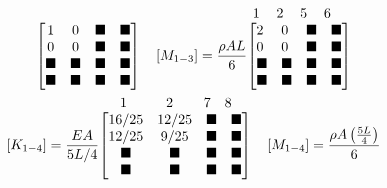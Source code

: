 \documentclass{AeroStructure-ERJohnson}
\begin{document}
\begin{example}
\begin{gather}
\begin{array}[b]{@{}l@{}}
\begin{array}{@{}l}
\end{array}\\
\left[\begin{array}{@{}cccc@{}}
1 & 0 & \blacksquare & \blacksquare \\0 & 0 & \blacksquare & \blacksquare \\\blacksquare & \blacksquare & \blacksquare & \blacksquare\\
\blacksquare & \blacksquare & \blacksquare & \blacksquare\\
\end{array}\right]\end{array} \quad\left[M_{1-3}\right]=\frac{\rho A L}{6}
\begin{array}[b]{@{}l@{}}
\begin{array}{@{}l}
\hspace*{4pt}1 \hspace*{12pt}2 \hspace*{12pt}5 \hspace*{12pt}6
\end{array}\\
\left[\begin{array}{@{}llll@{}}2 & 0 & \blacksquare& \blacksquare \\
0 & 0 & \blacksquare & \blacksquare\\
\blacksquare & \blacksquare & \blacksquare & \blacksquare\\
\blacksquare & \blacksquare & \blacksquare & \blacksquare\end{array}\right]\end{array}\label{ex18.3b}\\
\left[K_{1-4}\right]=\frac{E A}{5 L/4}
\begin{array}[b]{@{}l@{}}
\begin{array}{@{}l}
\hspace*{15pt}1 \hspace*{28pt}2 \hspace*{22pt}7 \hspace*{10pt}8
\end{array}\\
\left[\begin{array}{@{}cccc@{}}
16/25 & 12/25 & \blacksquare & \boldsymbol{\blacksquare} \\12/25 & 9/25 & \boldsymbol{\blacksquare} & \boldsymbol{\blacksquare} \\ \boldsymbol{\blacksquare} & \boldsymbol{\blacksquare}& \boldsymbol{\blacksquare}& \boldsymbol{\blacksquare}\\
\boldsymbol{\blacksquare} & \boldsymbol{\blacksquare}& \boldsymbol{\blacksquare}& \boldsymbol{\blacksquare}\end{array}\right]\end{array} \quad\left[M_{1-4}\right]=\frac{\rho A\left(\frac{5 L}{4}\right)}{6}

\end{gather}
\end{example}
\end{document}
